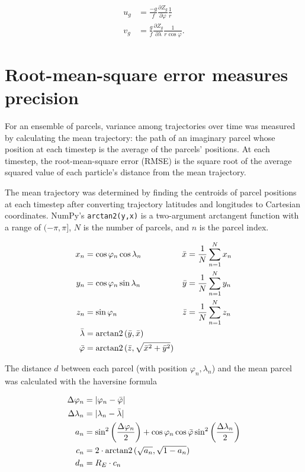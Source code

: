 \begin{align}
    u_g &= \frac{-g}{f} \frac{\partial Z_g}{\partial \varphi} \frac{1}{r} \label{eq:u_g} \\
    v_g &= \frac{g}{f} \frac{\partial Z_g}{\partial \lambda} \frac{1}{r \cos{\varphi}}. \label{eq:v_g}
\end{align}

\section{Root-mean-square error measures precision}
For an ensemble of parcels, variance among trajectories over time was measured by calculating the mean trajectory: the path of an imaginary parcel whose position at each timestep is the average of the parcels' positions.
At each timestep, the root-mean-square error (RMSE) is the square root of the average squared value of each particle's distance from the mean trajectory.

The mean trajectory was determined by finding the centroids of parcel positions at each timestep after converting trajectory latitudes and longitudes to Cartesian coordinates. 
NumPy's \texttt{arctan2(y,x)} is a two-argument arctangent function with a range of $(-\pi, \pi]$, $N$ is the number of parcels, and $n$ is the parcel index.

\begin{align}
    x_n &= \cos \varphi_n \cos \lambda_n & \bar{x} &= \frac{1}{N} \sum_{n = 1}^{N} x_n \\
    y_n &= \cos \varphi_n \sin \lambda_n & \bar{y} &= \frac{1}{N} \sum_{n = 1}^{N} y_n \\
    z_n &= \sin \varphi_n & \bar{z} &= \frac{1}{N} \sum_{n = 1}^{N} z_n \\
    \bar{\lambda} &= \operatorname{arctan2}{(\bar{y},\bar{x})} \\
    \bar{\varphi} &= \operatorname{arctan2}{(\bar{z}, \sqrt{\bar{x}^2 + \bar{y}^2})}
\end{align}

The distance $d$ between each parcel (with position $\varphi_n, \lambda_n$) and the mean parcel was calculated with the haversine formula

\begin{align}
    \Delta \varphi_n &= | \varphi_n - \bar{\varphi}| \label{eq:delta_lat} \\
    \Delta \lambda_n &= |\lambda_n - \bar{\lambda}| \label{eq:delta_lon} \\
    a_n &= \sin^2 \left ( \frac{\Delta \varphi_n}{2} \right ) + \cos{\varphi_n}  \cos{\bar{\varphi}} \sin^2 \left ( \frac{\Delta \lambda_n}{2} \right ) \\
    c_n &= 2 \cdot \operatorname{arctan2}{(\sqrt{a_n}, \sqrt{1 - a_n})} \\
    d_n &= R_E \cdot c_n
\end{align}

